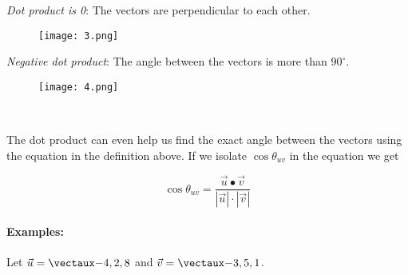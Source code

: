 \documentclass{article}
\begin{document}
\begin{minipage}{0.45\textwidth}
\begin{flushleft}
\textit{Dot product is 0}: The vectors are perpendicular to each other. 
\end{flushleft}
\end{minipage} \hfill
\begin{minipage}{0.45\textwidth}
\begin{figure}[H]
\texttt{[image: 3.png]}
\end{figure}
\end{minipage}


\begin{minipage}{0.45\textwidth}
\begin{flushleft}
\textit{Negative dot product}: The angle between the vectors is more than $90^\circ$.  
\end{flushleft}
\end{minipage} \hfill
\begin{minipage}{0.45\textwidth}
\begin{figure}[H]
\texttt{[image: 4.png]}
\end{figure}
\end{minipage}

\

The dot product can even help us find the exact angle between the vectors using the equation in the definition above. If we isolate $\cos \theta_{uv}$ in the equation we get 

\[
\cos\theta_{uv}=\frac{\vec{u}\bullet\vec{v}}{|\vec{u}|\cdot|\vec{v}|}
\]

\paragraph{Examples:} 

Let $\vec{u} = \vect{-4,2,8}$ and $\vec{v} = \vect{-3,5,1}$.
\end{document}
